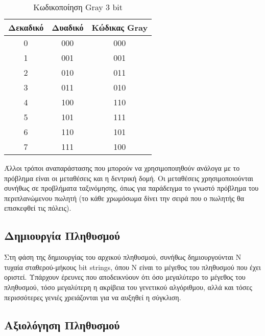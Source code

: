 \begin{table}[!t]
    \renewcommand{\arraystretch}{1.3}
    \caption{Κωδικοποίηση Gray 3 bit}
    \label{table_gray_code}
    \centering
    \begin{tabular}{c|c|c}
        \hline
        \bfseries Δεκαδικό & \bfseries Δυαδικό & \bfseries Κώδικας Gray\\
        \hline\hline
        0 & 000 & 000\\
        1 & 001 & 001\\
        2 & 010 & 011\\
        3 & 011 & 010\\
        4 & 100 & 110\\
        5 & 101 & 111\\
        6 & 110 & 101\\
        7 & 111 & 100\\
        \hline
    \end{tabular}
\end{table}

Άλλοι τρόποι αναπαράστασης που μπορούν να χρησιμοποιηθούν ανάλογα με το πρόβλημα είναι οι μεταθέσεις και η δεντρική δομή. Οι μεταθέσεις χρησιμοποιούνται συνήθως σε προβλήματα ταξινόμησης, όπως για παράδειγμα το γνωστό πρόβλημα του περιπλανώμενου πωλητή (το κάθε χρωμόσωμα δίνει την σειρά που ο πωλητής θα επισκεφθεί τις πόλεις). \cite{Obitko}

\subsection{Δημιουργία Πληθυσμού}

Στη φάση της δημιουργίας του αρχικού πληθυσμού, συνήθως δημιουργούνται Ν τυχαία σταθερού-μήκους bit strings, όπου Ν είναι το μέγεθος του πληθυσμού που έχει οριστεί. Υπάρχουν έρευνες που αποδεικνύουν ότι όσο μεγαλύτερο το μέγεθος του πληθυσμού, τόσο μεγαλύτερη η ακρίβεια του γενετικού αλγόριθμου, αλλά και τόσες περισσότερες γενιές χρειάζονται για να αυξηθεί η σύγκλιση. \cite{Gotshall2008}

\subsection{Αξιολόγηση Πληθυσμού}


